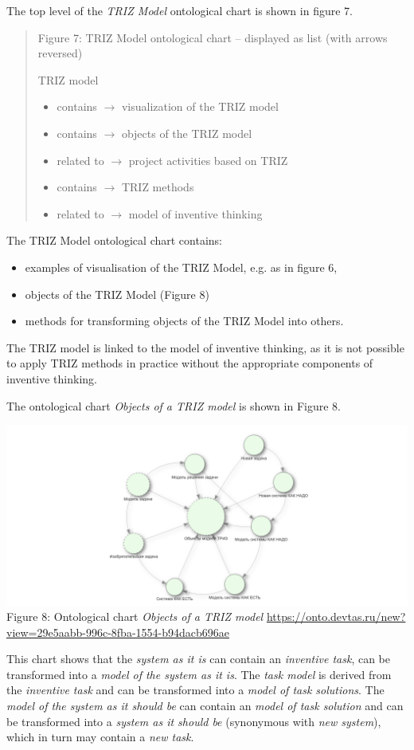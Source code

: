 \documentclass[11pt,a4paper]{article}
\begin{document}
The top level of the \emph{TRIZ Model} ontological chart is shown in figure 7.
\begin{quote}
  Figure 7: TRIZ Model ontological chart -- displayed as list (with arrows
  reversed)

  TRIZ model
  \begin{itemize}[noitemsep]
  \item contains $\to$ visualization of the TRIZ model
  \item contains $\to$ objects of the TRIZ model
  \item related to $\to$ project activities based on TRIZ
  \item contains $\to$ TRIZ methods
  \item related to $\to$ model of inventive thinking
  \end{itemize}
\end{quote}
The TRIZ Model ontological chart contains:
\begin{itemize}[noitemsep]
\item examples of visualisation of the TRIZ Model, e.g. as in figure 6,
\item objects of the TRIZ Model (Figure 8)
\item methods for transforming objects of the TRIZ Model into others.
\end{itemize}
The TRIZ model is linked to the model of inventive thinking, as it is not
possible to apply TRIZ methods in practice without the appropriate components
of inventive thinking.

The ontological chart \emph{Objects of a TRIZ model} is shown in Figure 8.

\begin{center}
  \includegraphics[width=\textwidth]{8.png}\\
  Figure 8: Ontological chart \emph{Objects of a TRIZ model}
  \url{https://onto.devtas.ru/new?view=29e5aabb-996c-8fba-1554-b94dacb696ae} 
\end{center}
This chart shows that the \emph{system as it is} can contain an
\emph{inventive task}, can be transformed into a \emph{model of the system as
  it is}.  The \emph{task model} is derived from the \emph{inventive task} and
can be transformed into a \emph{model of task solutions}. The \emph{model of
  the system as it should be} can contain an \emph{model of task solution} and
can be transformed into a \emph{system as it should be} (synonymous with
\emph{new system}), which in turn may contain a \emph{new task}.
\end{document}
